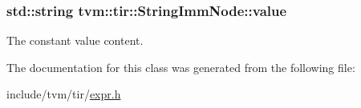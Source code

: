 \subsubsection[{\texorpdfstring{value}{value}}]{\setlength{\rightskip}{0pt plus 5cm}std\+::string tvm\+::tir\+::\+String\+Imm\+Node\+::value}\hypertarget{classtvm_1_1tir_1_1StringImmNode_a08c2e772796d2e2375f3ec6c6b95b4c8}{}\label{classtvm_1_1tir_1_1StringImmNode_a08c2e772796d2e2375f3ec6c6b95b4c8}


The constant value content. 



The documentation for this class was generated from the following file\+:\begin{DoxyCompactItemize}
\item 
include/tvm/tir/\hyperlink{tir_2expr_8h}{expr.\+h}\end{DoxyCompactItemize}

